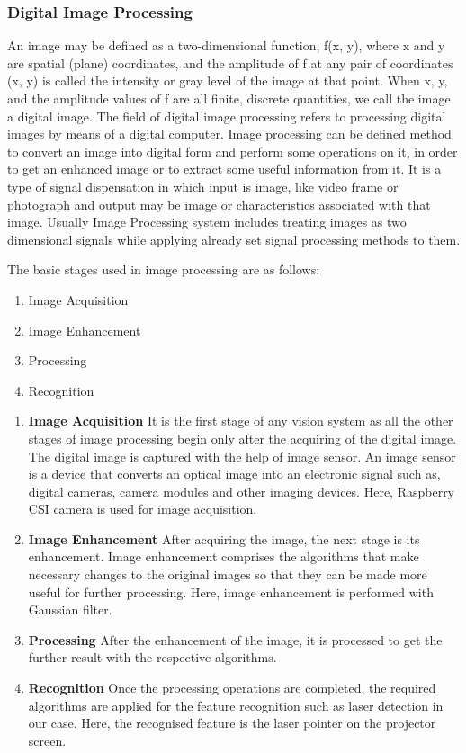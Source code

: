 \documentclass[12pt, a4paper]{article}
\begin{document}
\subsubsection{Digital Image Processing}
An image may be defined as a two-dimensional function, f(x, y), where x and y are spatial (plane) coordinates, and the amplitude of f at any pair of coordinates (x, y) is called the intensity or gray level of the image at that point. When x, y, and the amplitude values of f are all finite, discrete quantities, we call the image a digital image. The field of digital image processing refers to processing digital images by means of a digital computer.
Image processing can be defined method to convert an image into digital form and perform some operations on it, in order to get an enhanced image or to extract some useful information from it. It is a type of signal dispensation in which input is image, like video frame or photograph and output may be image or characteristics associated with that image. Usually Image Processing system includes treating images as two dimensional signals while applying already set signal processing methods to them.

The basic stages used in image processing are as follows:
\begin{enumerate}
\item Image Acquisition
\item Image Enhancement
\item Processing
\item Recognition
\end{enumerate}

\begin{enumerate}
\item \textbf{Image Acquisition}
It is the first stage of any vision system as all the other stages of image processing begin only after the acquiring of the digital image. The digital image is captured with the help of image sensor. An image sensor is a device that converts an optical image into an electronic signal such as, digital cameras, camera modules and other imaging devices. Here, Raspberry CSI camera is used for image acquisition.

\item \textbf{Image Enhancement}
After acquiring the image, the next stage is its enhancement. Image enhancement comprises the algorithms that make necessary changes to the original images so that they can be made more useful for further processing. Here, image enhancement is performed with Gaussian filter.

\item \textbf{Processing}
After the enhancement of the image, it is processed to get the further result with the respective algorithms.

\item \textbf{Recognition}
Once the  processing operations are completed, the required algorithms are applied for the feature recognition such as laser detection in our case. Here, the recognised feature is the laser pointer on the projector screen.
\end{enumerate}
\end{document}
